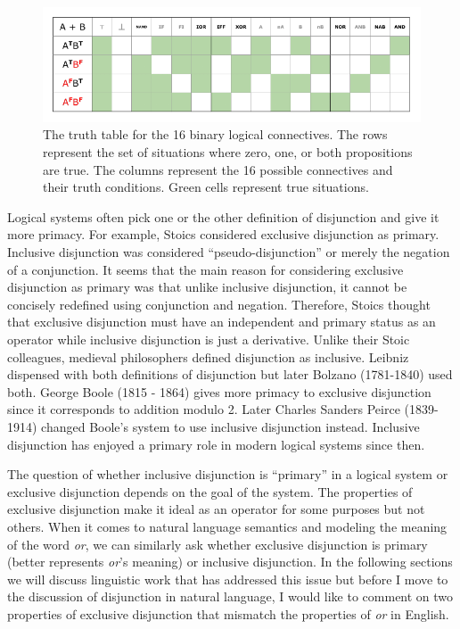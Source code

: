 \documentclass[oneside]{report}
\theoremstyle{definition}
\theoremstyle{definition}
\theoremstyle{definition}
\theoremstyle{remark}
\begin{document}
\begin{figure}[tb]

{\centering \includegraphics{figs/binaryLogicalConnectives-1} 

}

\caption{The truth table for the 16 binary logical connectives. The rows represent the set of situations where zero, one, or both propositions are true. The columns represent the 16 possible connectives and their truth conditions. Green cells represent true situations.}\label{fig:binaryLogicalConnectives}
\end{figure}
Logical systems often pick one or the other definition of disjunction
and give it more primacy. For example, Stoics considered exclusive
disjunction as primary. Inclusive disjunction was considered
``pseudo-disjunction'' or merely the negation of a conjunction. It seems
that the main reason for considering exclusive disjunction as primary
was that unlike inclusive disjunction, it cannot be concisely redefined
using conjunction and negation. Therefore, Stoics thought that exclusive
disjunction must have an independent and primary status as an operator
while inclusive disjunction is just a derivative. Unlike their Stoic
colleagues, medieval philosophers defined disjunction as inclusive.
Leibniz dispensed with both definitions of disjunction but later Bolzano
(1781-1840) used both. George Boole (1815 - 1864) gives more primacy to
exclusive disjunction since it corresponds to addition modulo 2. Later
Charles Sanders Peirce (1839-1914) changed Boole's system to use
inclusive disjunction instead. Inclusive disjunction has enjoyed a
primary role in modern logical systems since then.

The question of whether inclusive disjunction is ``primary'' in a
logical system or exclusive disjunction depends on the goal of the
system. The properties of exclusive disjunction make it ideal as an
operator for some purposes but not others. When it comes to natural
language semantics and modeling the meaning of the word \emph{or}, we
can similarly ask whether exclusive disjunction is primary (better
represents \emph{or}'s meaning) or inclusive disjunction. In the
following sections we will discuss linguistic work that has addressed
this issue but before I move to the discussion of disjunction in natural
language, I would like to comment on two properties of exclusive
disjunction that mismatch the properties of \emph{or} in English.
\end{document}
